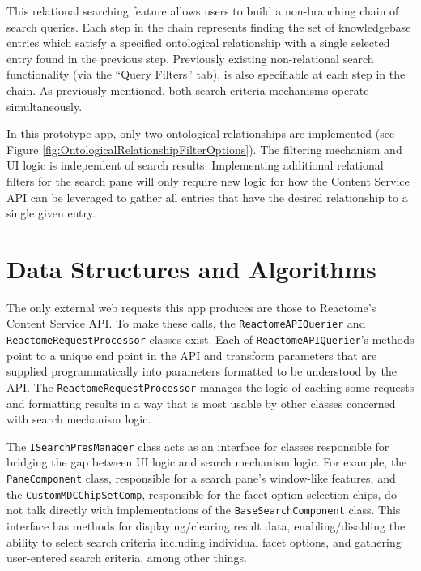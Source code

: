 \documentclass[12pt]{report}
\begin{document}
This relational searching feature allows users to build a non-branching chain of search queries. Each step in the chain represents finding the set of knowledgebase entries which satisfy a specified ontological relationship with a single selected entry found in the previous step. Previously existing non-relational search functionality (via the ``Query Filters'' tab), is also specifiable at each step in the chain. As previously mentioned, both search criteria mechanisms operate simultaneously.

In this prototype app, only two ontological relationships are implemented (see Figure \ref{fig:OntologicalRelationshipFilterOptions}). The filtering mechanism and UI logic is independent of search results. Implementing additional relational filters for the search pane will only require new logic for how the Content Service API can be leveraged to gather all entries that have the desired relationship to a single given entry.

\section {Data Structures and Algorithms}
The only external web requests this app produces are those to Reactome's Content Service API. To make these calls, the \verb|ReactomeAPIQuerier| and \verb|ReactomeRequestProcessor| classes exist. Each of \verb|ReactomeAPIQuerier|'s methods point to a unique end point in the API and transform parameters that are supplied programmatically into parameters formatted to be understood by the API. The \verb|ReactomeRequestProcessor| manages the logic of caching some requests and formatting results in a way that is most usable by other classes concerned with search mechanism logic.

The \verb|ISearchPresManager| class acts as an interface for classes responsible for bridging the gap between UI logic and search mechanism logic. For example, the \verb|PaneComponent| class, responsible for a search pane's window-like features, and the \verb|CustomMDCChipSetComp|, responsible for the facet option selection chips, do not talk directly with implementations of the \verb|BaseSearchComponent| class. This interface has methods for displaying/clearing result data, enabling/disabling the ability to select search criteria including individual facet options, and gathering user-entered search criteria, among other things.
\end{document}
